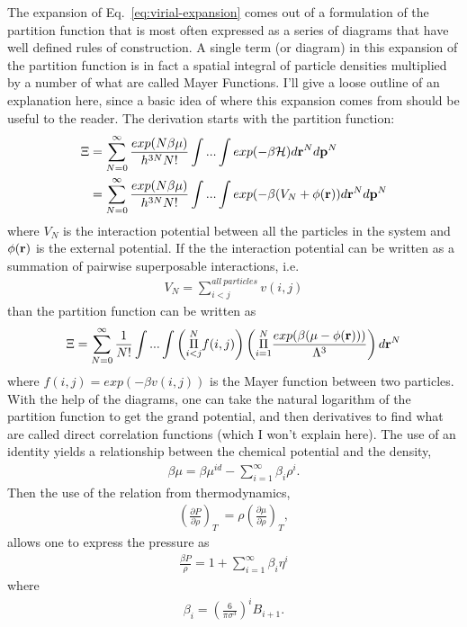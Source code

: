 The expansion of Eq.~\ref{eq:virial-expansion} comes out of a
formulation of the partition function that is most often expressed as
a series of diagrams that have well defined rules of construction.
A single term (or diagram) in this expansion of the partition function
is in fact a spatial integral of particle densities multiplied by a
number of what are called Mayer Functions.  I'll give a loose outline
of an explanation here, since a basic idea of where this expansion
comes from should be useful to the reader.  The derivation starts with
the partition function:
\begin{align}
  \Xi &= \sum_{N=0}^{\infty}\frac{exp(N\beta\mu)}{h^{3N}N!}\int...\int exp(-\beta \mathcal{H})d\textbf{r}^Nd\mathbf{p}^N \\
  &=\sum_{N=0}^{\infty}\frac{exp(N\beta\mu)}{h^{3N}N!}\int...\int exp(-\beta (V_N + \phi(\textbf{r}))d\textbf{r}^Nd\mathbf{p}^N
\end{align}
where $V_N$ is the interaction potential between all the particles in
the system and $\phi(\textbf{r})$ is the external potential.  If the the
interaction potential can be written as a summation of pairwise
superposable interactions, i.e.
\begin{align}
  V_N = \sum_{i<j}^{all~particles} v(i,j)
\end{align}
 than the partition function can be written as
\begin{align}
  \Xi = \sum_{N=0}^{\infty}\frac{1}{N!}\int... \int \left(\overset{N}{\underset{i<j}{\Pi}} f(i,j)\right)
  \left( \overset{N}{\underset{i=1}{\Pi}} \frac{exp(\beta (\mu - \phi(\textbf{r})))}{\Lambda^3}\right)d\textbf{r}^N
\end{align}
where $f(i,j)=exp(-\beta v(i,j))$ is the Mayer function between two
particles.  With the help of the diagrams, one can take the natural
logarithm of the partition function to get the grand potential, and
then derivatives to find what are called direct correlation functions
(which I won't explain here). The use of an identity yields a
relationship between the chemical potential and the density,
\begin{align}
  \beta \mu = \beta \mu^{id} - \sum_{i=1}^{\infty}\beta_i\rho^i.
\end{align}
Then the use of the relation from thermodynamics,
\begin{align}
  \left(\frac{\partial P}{\partial \rho}\right)_T \
  = \rho \left(\frac{\partial \mu}{\partial \rho}\right)_T,
\end{align}
allows one to express the pressure as
\begin{align}
  \frac{\beta P}{\rho} = 1 + \sum_{i=1}^{\infty}\beta_i\eta^i
\end{align}
where
\begin{align}
  \label{eq:virial-coeff}
  \beta_i = (\frac{6}{\pi \sigma^3})^i B_{i+1}.
\end{align}

